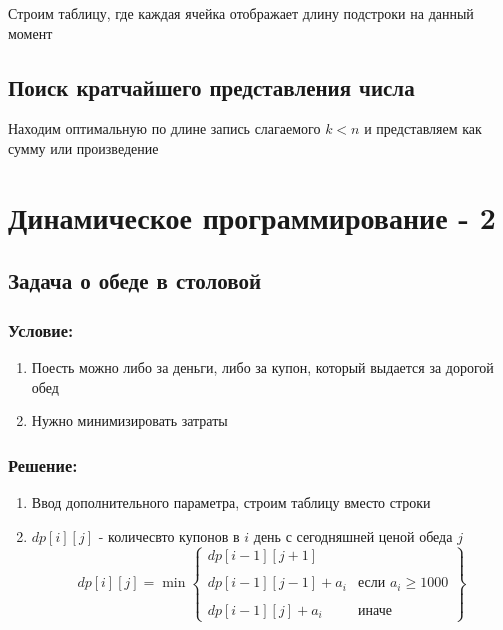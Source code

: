 Строим таблицу, где каждая ячейка отображает длину подстроки на данный момент


\subsection{Поиск кратчайшего представления числа}

Находим оптимальную по длине запись слагаемого $k < n$ и представляем как сумму или произведение


\section{Динамическое программирование - 2}

\subsection{Задача о обеде в столовой}

\subsubsection{Условие:}

\begin{enumerate}
    \item Поесть можно либо за деньги, либо за купон, который выдается за дорогой обед 
    \item Нужно минимизировать затраты
\end{enumerate}

\subsubsection{Решение:}

\begin{enumerate}
    \item Ввод дополнительного параметра, строим таблицу вместо строки
    \item $dp[i][j]$ - количесвто купонов в $i$ день с сегодняшней ценой обеда $j$
    $$dp[i][j] = \min\left\{\begin{matrix}
        dp[i - 1][j + 1] & \\\\
        dp[i - 1][j - 1] + a_i & \text{если $a_i \geq 1000$} \\\\
        dp[i - 1][j] + a_i & \text{иначе}
    \end{matrix}\right\}$$
\end{enumerate}


